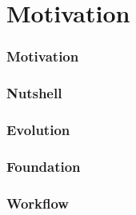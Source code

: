 \part{Motivation}
\section{Motivation}


\section{Nutshell}

\section{Evolution}

% 

% 
\section{Foundation}

% 
% 
\section{Workflow}
% 

